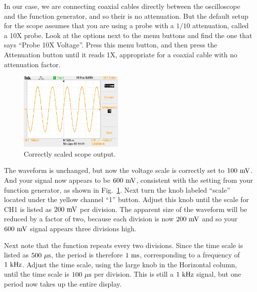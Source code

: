 In our case, we are connecting coaxial cables directly between the
oscilloscope and the function generator, and so their is no
attenuation.  But the default setup for the scope assumes that you are
using a probe with a $1/10$ attenuation, called a 10X probe.  Look at
the options next to the menu buttons and find the one that says
``Probe 10X Voltage''.  Press this menu button, and then press the
Attenuation button until it reads 1X, appropriate for a coaxial cable
with no attenuation factor.
\begin{figure}[htbp]
\begin{center}
\includegraphics[width=0.45\textwidth]{figs/labs/lissajous/sine.jpg} 
\caption{Correctly scaled scope output.}
\label{fig:scopesine}
\end{center}
\end{figure}
The waveform is unchanged, but now the voltage scale is correctly set
to $100~\rm mV$.  And your signal now appears to be $600~\rm mV$,
consistent with the setting from your function generator, as shown in
Fig.~\ref{fig:scopesine}.  Next turn the knob labeled ``scale'' located
under the yellow channel ``1'' button.  Adjust this knob until the
scale for CH1 is listed as $200~\rm mV$ per division.  The apparent
size of the waveform will be reduced by a factor of two, because each
division is now $200~\rm mV$ and so your $600~\rm mV$ signal appears
three divisions high.

Next note that the function repeats every two divisions.  Since the
time scale is listed as $500~\rm \mu s$, the period is therefore $1~\rm
ms$, corresponding to a frequency of $1~\rm kHz$.  Adjust the time
scale, using the large knob in the Horizontal column, until the time
scale is $100~\rm \mu s$ per division.  This is still a $1~\rm kHz$
signal, but one period now takes up the entire display.

